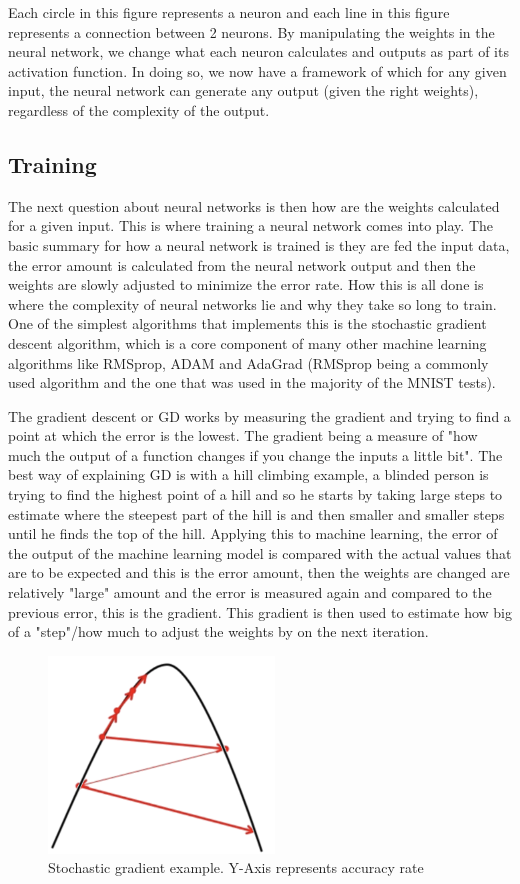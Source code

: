 \documentclass[a4paper,oneside,phd,etd]{BYUPhys}
\begin{document}
Each circle in this figure represents a neuron and each line in this figure represents a connection between 2 neurons. By manipulating the weights in the neural network, we change what each neuron calculates and outputs as part of its activation function. In doing so, we now have a framework of which for any given input, the neural network can generate any output (given the right weights), regardless of the complexity of the output\cite{nielsen}. 

\subsection{Training}
The next question about neural networks is then how are the weights calculated for a given input. This is where training a neural network comes into play. The basic summary for how a neural network is trained is they are fed the input data, the error amount is calculated from the neural network output and then the weights are slowly adjusted to minimize the error rate. How this is all done is where the complexity of neural networks lie and why they take so long to train. One of the simplest algorithms that implements this is the stochastic gradient descent algorithm, which is a core component of many other machine learning algorithms like RMSprop, ADAM and AdaGrad (RMSprop being a commonly used algorithm and the one that was used in the majority of the MNIST tests). 

The gradient descent or GD works by measuring the gradient and trying to find a point at which the error is the lowest. The gradient being a measure of "how much the output of a function changes if you change the inputs a little bit"\cite{towards-data-science}.
The best way of explaining GD is with a hill climbing example, a blinded person is trying to find the highest point of a hill and so he starts by taking large steps to estimate where the steepest part of the hill is and then smaller and smaller steps until he finds the top of the hill. Applying this to machine learning, the error of the output of the machine learning model is compared with the actual values that are to be expected and this is the error amount, then the weights are changed are relatively "large" amount and the error is measured again and compared to the previous error, this is the gradient. This gradient is then used to estimate how big of a "step"/how much to adjust the weights by on the next iteration.
\begin{figure}[H]
\centering
\includegraphics[width=6cm]{pictures/gradient.png}
\caption{Stochastic gradient example.
Y-Axis represents accuracy rate}
\label{fig:gradient}
\end{figure}
\end{document}

